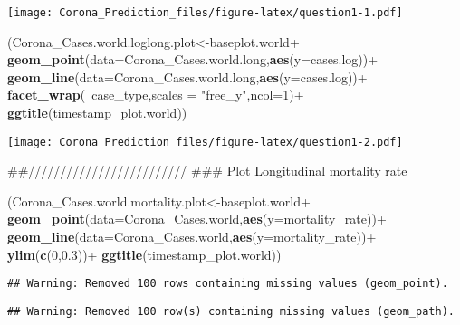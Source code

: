 \documentclass[]{article}
\newenvironment{Shaded}{\begin{snugshade}}{\end{snugshade}}
\newcommand{\KeywordTok}[1]{\textcolor[rgb]{0.13,0.29,0.53}{\textbf{{#1}}}}
\newcommand{\DataTypeTok}[1]{\textcolor[rgb]{0.13,0.29,0.53}{{#1}}}
\newcommand{\DecValTok}[1]{\textcolor[rgb]{0.00,0.00,0.81}{{#1}}}
\newcommand{\FloatTok}[1]{\textcolor[rgb]{0.00,0.00,0.81}{{#1}}}
\newcommand{\StringTok}[1]{\textcolor[rgb]{0.31,0.60,0.02}{{#1}}}
\newcommand{\NormalTok}[1]{{#1}}
\begin{document}
\texttt{[image: Corona\_Prediction\_files/figure-latex/question1-1.pdf]}

\begin{Shaded}
\begin{Highlighting}[]
\NormalTok{(Corona_Cases.world.loglong.plot<-baseplot.world+}
\StringTok{    }\KeywordTok{geom_point}\NormalTok{(}\DataTypeTok{data=}\NormalTok{Corona_Cases.world.long,}\KeywordTok{aes}\NormalTok{(}\DataTypeTok{y=}\NormalTok{cases.log))+}
\StringTok{    }\KeywordTok{geom_line}\NormalTok{(}\DataTypeTok{data=}\NormalTok{Corona_Cases.world.long,}\KeywordTok{aes}\NormalTok{(}\DataTypeTok{y=}\NormalTok{cases.log))+}
\StringTok{    }\KeywordTok{facet_wrap}\NormalTok{(~case_type,}\DataTypeTok{scales =} \StringTok{"free_y"}\NormalTok{,}\DataTypeTok{ncol=}\DecValTok{1}\NormalTok{)+}
\StringTok{    }\KeywordTok{ggtitle}\NormalTok{(timestamp_plot.world))}
\end{Highlighting}
\end{Shaded}

\texttt{[image: Corona\_Prediction\_files/figure-latex/question1-2.pdf]}

\begin{Shaded}
\begin{Highlighting}[]
\NormalTok{##/////////////////////////}
\NormalTok{### Plot Longitudinal mortality rate}

\NormalTok{(Corona_Cases.world.mortality.plot<-baseplot.world+}
\StringTok{    }\KeywordTok{geom_point}\NormalTok{(}\DataTypeTok{data=}\NormalTok{Corona_Cases.world,}\KeywordTok{aes}\NormalTok{(}\DataTypeTok{y=}\NormalTok{mortality_rate))+}
\StringTok{    }\KeywordTok{geom_line}\NormalTok{(}\DataTypeTok{data=}\NormalTok{Corona_Cases.world,}\KeywordTok{aes}\NormalTok{(}\DataTypeTok{y=}\NormalTok{mortality_rate))+}
\StringTok{    }\KeywordTok{ylim}\NormalTok{(}\KeywordTok{c}\NormalTok{(}\DecValTok{0}\NormalTok{,}\FloatTok{0.3}\NormalTok{))+}
\StringTok{    }\KeywordTok{ggtitle}\NormalTok{(timestamp_plot.world))}
\end{Highlighting}
\end{Shaded}

\begin{verbatim}
## Warning: Removed 100 rows containing missing values (geom_point).
\end{verbatim}

\begin{verbatim}
## Warning: Removed 100 row(s) containing missing values (geom_path).
\end{verbatim}
\end{document}
